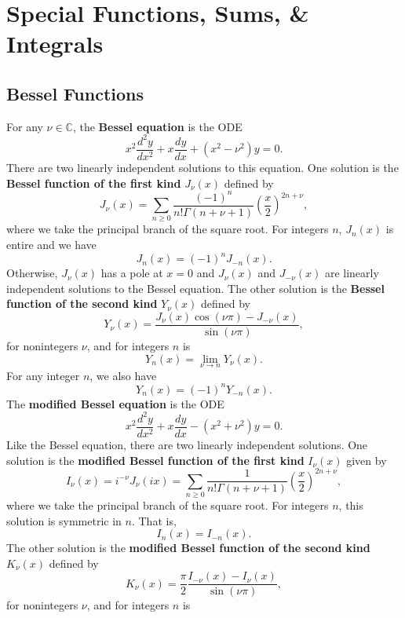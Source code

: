 \documentclass[12pt]{book}
\theoremstyle{definition}\newframedtheorem{method}{Method}
\newcommand{\C}{\mathbb{C}}
\newcommand{\G}{\Gamma}
\newcommand{\<}{\langle}
\renewcommand{\>}{\rangle}
\begin{document}
\chapter{Special Functions, Sums, \& Integrals}
  \section{Bessel Functions}\label{append:Bessel_Functions}
    For any $\nu \in \C$, the \textbf{Bessel equation} is the ODE
    \[
      x^{2}\frac{d^{2}y}{dx^{2}}+x\frac{dy}{dx}+(x^{2}-\nu^{2})y = 0.
    \]
    There are two linearly independent solutions to this equation. One solution is the \textbf{Bessel function of the first kind} $J_{\nu}(x)$ defined by
    \[
      J_{\nu}(x) = \sum_{n \ge 0}\frac{(-1)^{n}}{n!\G(n+\nu+1)}\left(\frac{x}{2}\right)^{2n+\nu},
    \]
    where we take the principal branch of the square root. For integers $n$, $J_{n}(x)$ is entire and we have
    \[
      J_{n}(x) = (-1)^{n}J_{-n}(x).
    \]
    Otherwise, $J_{\nu}(x)$ has a pole at $x = 0$ and $J_{\nu}(x)$ and $J_{-\nu}(x)$ are linearly independent solutions to the Bessel equation. The other solution is the \textbf{Bessel function of the second kind} $Y_{\nu}(x)$ defined by
    \[
      Y_{\nu}(x) = \frac{J_{\nu}(x)\cos(\nu\pi)-J_{-\nu}(x)}{\sin(\nu\pi)},
    \]
    for nonintegers $\nu$, and for integers $n$ is
    \[
      Y_{n}(x) = \lim_{\nu \to n}Y_{\nu}(x).
    \]
    For any integer $n$, we also have
    \[
      Y_{n}(x) = (-1)^{n}Y_{-n}(x).
    \]
    The \textbf{modified Bessel equation} is the ODE
    \[
      x^{2}\frac{d^{2}y}{dx^{2}}+x\frac{dy}{dx}-(x^{2}+\nu^{2})y = 0.
    \]
    Like the Bessel equation, there are two linearly independent solutions. One solution is the \textbf{modified Bessel function of the first kind} $I_{\nu}(x)$ given by
    \[
      I_{\nu}(x) = i^{-\nu}J_{\nu}(ix) = \sum_{n \ge 0}\frac{1}{n!\G(n+\nu+1)}\left(\frac{x}{2}\right)^{2n+\nu},
    \]
    where we take the principal branch of the square root. For integers $n$, this solution is symmetric in $n$. That is,
    \[
      I_{n}(x) = I_{-n}(x).
    \]
    The other solution is the \textbf{modified Bessel function of the second kind} $K_{\nu}(x)$ defined by
    \[
      K_{\nu}(x) = \frac{\pi}{2}\frac{I_{-\nu}(x)-I_{\nu}(x)}{\sin(\nu\pi)},
    \]
    for nonintegers $\nu$, and for integers $n$ is
\end{document}
